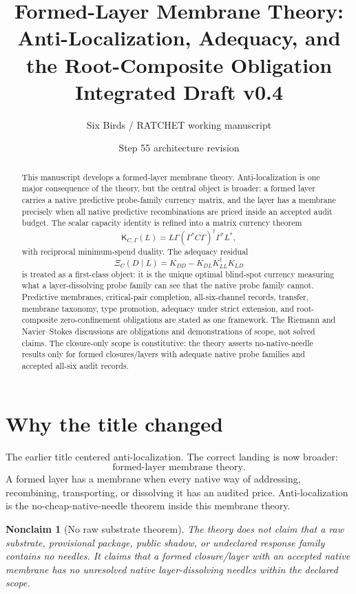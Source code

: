 \documentclass[11pt]{article}
\title{Formed-Layer Membrane Theory:\\
Anti-Localization, Adequacy, and the Root-Composite Obligation\\
\large Integrated Draft v0.4}
\author{Six Birds / RATCHET working manuscript}
\date{Step 55 architecture revision}
\newtheorem{nonclaim}[theorem]{Nonclaim}
\newcommand{\K}{\mathsf K}
\begin{document}
\maketitle

\begin{abstract}
This manuscript develops a formed-layer membrane theory.  Anti-localization is one major consequence of the theory, but the central object is broader: a formed layer carries a native predictive probe-family currency matrix, and the layer has a membrane precisely when all native predictive recombinations are priced inside an accepted audit budget.  The scalar capacity identity is refined into a matrix currency theorem
\[
  \K_{C,\Gamma}(L)=L\Gamma(\Gamma^*C\Gamma)^\dagger\Gamma^*L^*,
\]
with reciprocal minimum-spend duality.  The adequacy residual
\[
  \Xi_C(D\mid L)=K_{DD}-K_{DL}K_{LL}^\dagger K_{LD}
\]
is treated as a first-class object: it is the unique optimal blind-spot currency measuring what a layer-dissolving probe family can see that the native probe family cannot.  Predictive membranes, critical-pair completion, all-six-channel records, transfer, membrane taxonomy, type promotion, adequacy under strict extension, and root-composite zero-confinement obligations are stated as one framework.  The Riemann and Navier--Stokes discussions are obligations and demonstrations of scope, not solved claims.  The closure-only scope is constitutive: the theory asserts no-native-needle results only for formed closures/layers with adequate native probe families and accepted all-six audit records.
\end{abstract}

\tableofcontents

\section{Why the title changed}

The earlier title centered anti-localization.  The correct landing is now broader:
\[
\boxed{\text{formed-layer membrane theory.}}
\]
A formed layer has a membrane when every native way of addressing, recombining, transporting, or dissolving it has an audited price.  Anti-localization is the no-cheap-native-needle theorem inside this membrane theory.

\begin{nonclaim}[No raw substrate theorem]
The theory does not claim that a raw substrate, provisional package, public shadow, or undeclared response family contains no needles.  It claims that a formed closure/layer with an accepted native membrane has no unresolved native layer-dissolving needles within the declared scope.
\end{nonclaim}
\end{document}
